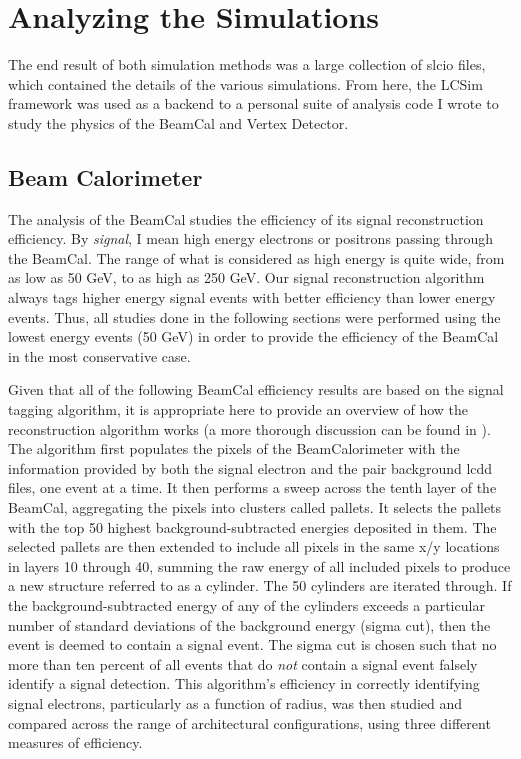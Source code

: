 \documentclass{report}
\begin{document}
    \chapter{Analyzing the Simulations}
        The end result of both simulation methods was a large collection of slcio files, which contained the details of the various simulations. From here, the LCSim framework was used as a backend to a personal suite of analysis code I wrote to study the physics of the BeamCal and Vertex Detector.


        \section{Beam Calorimeter}
            The analysis of the BeamCal studies the efficiency of its signal reconstruction efficiency. By \textit{signal}, I mean high energy electrons or positrons passing through the BeamCal. The range of what is considered as high energy is quite wide, from as low as 50 GeV, to as high as 250 GeV. Our signal reconstruction algorithm always tags higher energy signal events with better efficiency than lower energy events. Thus, all studies done in the following sections were performed using the lowest energy events (50 GeV) in order to provide the efficiency of the BeamCal in the most conservative case.  

            Given that all of the following BeamCal efficiency results are based on the signal tagging algorithm, it is appropriate here to provide an overview of how the reconstruction algorithm works (a more thorough discussion can be found in \cite{bogert_thesis}). The algorithm first populates the pixels of the BeamCalorimeter with the information provided by both the signal electron and the pair background lcdd files, one event at a time. It then performs a sweep across the tenth layer of the BeamCal, aggregating the pixels into clusters called pallets. It selects the pallets with the top 50 highest background-subtracted energies deposited in them. The selected pallets are then extended to include all pixels in the same x/y locations in layers 10 through 40, summing the raw energy of all included pixels to produce a new structure referred to as a cylinder. The 50 cylinders are iterated through. If the background-subtracted energy of any of the cylinders exceeds a particular number of standard deviations of the background energy (sigma cut), then the event is deemed to contain a signal event. The sigma cut is chosen such that no more than ten percent of all events that do \textit{not} contain a signal event falsely identify a signal detection. This algorithm's efficiency in correctly identifying signal electrons, particularly as a function of radius, was then studied and compared across the range of architectural configurations, using three different measures of efficiency.
\end{document}
